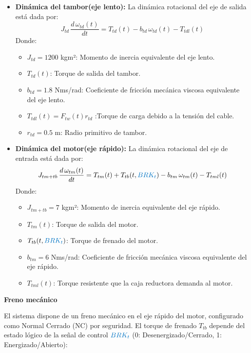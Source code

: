 \documentclass{article}
\begin{document}
\begin{itemize}
    \item \textbf{Dinámica del tambor(eje lento):} La dinámica rotacional del eje de salida está dada por:
    \begin{equation}
    J_{td} \, \frac{d \, \omega_{td}(t)}{dt} = T_{td}(t) - b_{td} \, \omega_{td}(t) - T_{tdl}(t)
    \label{eq:dinamica_tambor_carro}
    \end{equation}
    Donde:
    \begin{itemize}
        \item $J_{td} = 1200$ kgm²: Momento de inercia equivalente del eje lento.
        \item $T_{td}(t)$: Torque de salida del tambor.
        \item $b_{td} = 1.8$ Nms/rad: Coeficiente de fricción mecánica viscosa equivalente del eje lento.
        \item $T_{tdl}(t) = F_{tw}(t) r_{td}$ :Torque de carga debido a la tensión del cable. 
        \item $r_{td} = 0.5$ m: Radio primitivo de tambor.
    \end{itemize}
    \item \textbf{Dinámica del motor(eje rápido):} La dinámica rotacional del eje de entrada está dada por:
    \begin{equation}
    J_{tm+tb} \, \frac{d \, \omega_{tm}(t)}{dt} = T_{tm}(t) + T_{tb}(t,\textcolor{signalcolor}{BRK_t}) - b_{tm} \, \omega_{tm}(t) - T_{tml}(t)
    \label{eq:dinamica_motor_carro}
    \end{equation}
    Donde:
    \begin{itemize}
        \item $J_{tm+tb} = 7$ kgm²: Momento de inercia equivalente del eje rápido.
        \item $T_{tm}(t)$: Torque de salida del motor.
        \item $T_{tb}(t,\textcolor{signalcolor}{BRK_t})$: Torque de frenado del motor.
        \item $b_{tm} = 6$ Nms/rad: Coeficiente de fricción mecánica viscosa equivalente del eje rápido.
        \item $T_{tml}(t)$: Torque resistente que la caja reductora demanda al motor.
    \end{itemize}
\end{itemize}

\noindent\textbf{Freno mecánico}

El sistema dispone de un freno mecánico en el eje rápido del motor, configurado como Normal Cerrado (NC) por seguridad. El torque de frenado $T_{tb}$ depende del estado lógico de la señal de control $\textcolor{signalcolor}{BRK_t}$ (0: Desenergizado/Cerrado, 1: Energizado/Abierto):
\end{document}
